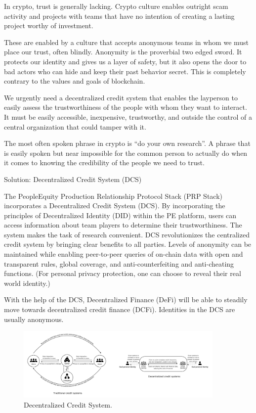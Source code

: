 \documentclass{article}
\begin{document}
In crypto, trust is generally lacking. Crypto culture enables outright scam activity and projects with teams that have no intention of creating a lasting project worthy of investment.

These are enabled by a culture that accepts anonymous teams in whom we must place our trust, often blindly. Anonymity is the proverbial two edged sword. It protects our identity and gives us a layer of safety, but it also opens the door to bad actors who can hide and keep their past behavior secret. This is completely contrary to the values and goals of blockchain. 

We urgently need a decentralized credit system that enables the layperson to easily assess the trustworthiness of the people with whom they want to interact. It must be easily accessible, inexpensive, trustworthy, and outside the control of a central organization that could tamper with it. 

The most often spoken phrase in crypto is “do your own research”. A phrase that is easily spoken but near impossible for the common person to actually do when it comes to knowing the credibility of the people we need to trust.

Solution: Decentralized Credit System (DCS)

The PeopleEquity Production Relationship Protocol Stack (PRP Stack) incorporates a Decentralized Credit System (DCS). By incorporating the principles of Decentralized Identity (DID) within the PE platform, users can access information about team players to determine their trustworthiness. The system makes the task of research convenient. DCS revolutionizes the centralized credit system by bringing clear benefits to all parties. Levels of anonymity can be maintained while enabling peer-to-peer queries of on-chain data with open and transparent rules, global coverage, and anti-counterfeiting and anti-cheating functions. (For personal privacy protection, one can choose to reveal their real world identity.)

With the help of the DCS, Decentralized Finance (DeFi) will be able to steadily move towards decentralized credit finance (DCFi). Identities in the DCS are usually anonymous. 

\begin{figure}
\centering
\includegraphics[width=0.9\textwidth]{./img/dcs.png}
\caption{\label{fig}Decentralized Credit System.}
\end{figure}
\end{document}
